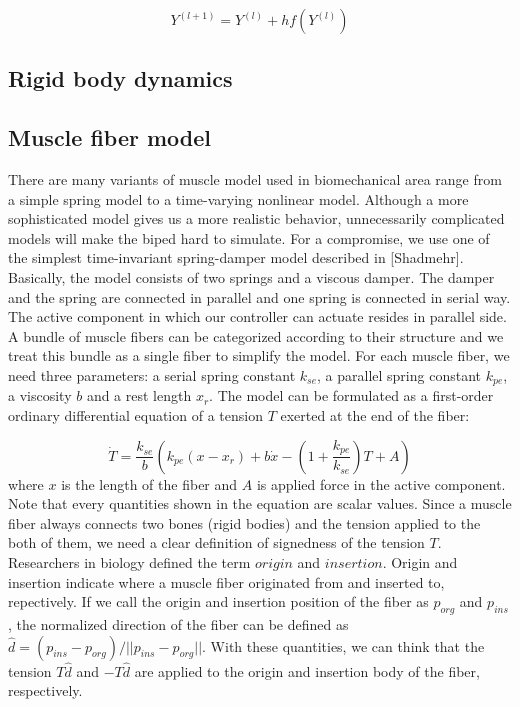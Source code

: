 \documentclass[a4paper,10pt]{article}
\begin{document}
\begin{equation}
Y^{(l+1)}=Y^{(l)}+hf(Y^{(l)})
\end{equation}

\subsection{Rigid body dynamics}

\subsection{Muscle fiber model}

There are many variants of muscle model used in biomechanical area range
from a simple spring model to a time-varying nonlinear model. Although
a more sophisticated model gives us a more realistic behavior, unnecessarily
complicated models will make the biped hard to simulate. For a compromise,
we use one of the simplest time-invariant spring-damper model described in [Shadmehr].
Basically, the model consists of two springs and a viscous damper.
The damper and the spring are connected in parallel and one spring is
connected in serial way. The active component in which our controller
can actuate resides in parallel side. A bundle of muscle fibers can be
categorized according to their structure and we treat this bundle as
a single fiber to simplify the model. For each muscle fiber, we need three
parameters: a serial spring constant $k_{se}$, a parallel spring constant $k_{pe}$,
a viscosity $b$ and a rest length $x_{r}$. The model can be formulated
as a first-order ordinary differential equation of a tension $T$ exerted
at the end of the fiber:

\begin{equation}\label{muscle-ode}
\dot{T} = \frac{k_{se}}{b} \left( k_{pe}(x-x_{r})+b\dot{x}-\left(1+\frac{k_{pe}}{k_{se}}\right)T+A   \right)
\end{equation}
where $x$ is the length of the fiber and $A$ is applied force in the active
component. Note that every quantities shown in the equation are scalar values.
Since a muscle fiber always connects two bones (rigid bodies) and the
tension applied to the both of them, we need a clear definition of signedness
of the tension $T$. Researchers in biology defined the term $origin$ and $insertion$.
Origin and insertion indicate where a muscle fiber originated from and inserted
to, repectively. If we call the origin and insertion position of the fiber
as $p_{org}$ and $p_{ins}$, the normalized direction of the fiber can be
defined as $\hat{d}=(p_{ins}-p_{org})/||p_{ins}-p_{org}||$. With these quantities, we can think that
the tension $T\hat{d}$ and $-T\hat{d}$ are applied to the origin and insertion body
of the fiber, respectively.
\end{document}
